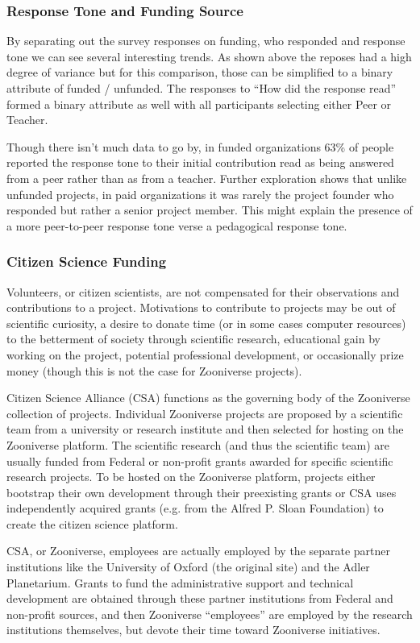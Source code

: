 \subsubsection{Response Tone and Funding Source}
By separating out the survey responses on funding, who responded and response tone we can see several interesting trends. As shown above the reposes had a high degree of variance but for this comparison, those can be simplified to a binary attribute of funded / unfunded. The responses to “How did the response read” formed a binary attribute as well with all participants selecting either Peer or Teacher.

Though there isn't much data to go by, in funded organizations 63\% of people reported the response tone to their initial contribution read as being answered from a peer rather than as from a teacher. Further exploration shows that unlike unfunded projects, in paid organizations it was rarely the project founder who responded but rather a senior project member. This might explain the presence of a more peer-to-peer response tone verse a pedagogical response tone.

\subsubsection{Citizen Science Funding}
Volunteers, or citizen scientists, are not compensated for their observations and contributions to a project. Motivations to contribute to projects may be out of scientific curiosity, a desire to donate time (or in some cases computer resources) to the betterment of society through scientific research, educational gain by working on the project, potential professional development, or occasionally prize money (though this is not the case for Zooniverse projects).
 
Citizen Science Alliance (CSA) functions as the governing body of the Zooniverse collection of projects. Individual Zooniverse projects are proposed by a scientific team from a university or research institute and then selected for hosting on the Zooniverse platform. The scientific research (and thus the scientific team) are usually funded from Federal or non-profit grants awarded for specific scientific research projects. To be hosted on the Zooniverse platform, projects either bootstrap their own development through their preexisting grants or CSA uses independently acquired grants (e.g. from the Alfred P. Sloan Foundation) to create the citizen science platform.
 
CSA, or Zooniverse, employees are actually employed by the separate partner institutions like the University of Oxford (the original site) and the Adler Planetarium. Grants to fund the administrative support and technical development are obtained through these partner institutions from Federal and non-profit sources, and then Zooniverse “employees” are employed by the research institutions themselves, but devote their time toward Zooniverse initiatives.
 
